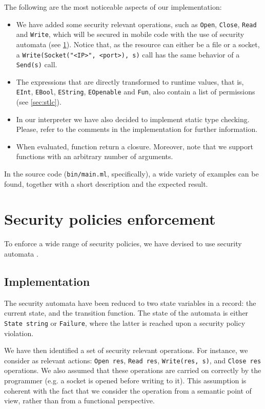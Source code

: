The following are the most noticeable aspects of our implementation:
\begin{itemize}
    \item We have added some security relevant operations, such as \lstinline{Open}, \lstinline{Close}, \lstinline{Read} and \lstinline{Write}, which will be secured in mobile code with the use of security automata (see \cref{sec:spe}). Notice that, as the resource can either be a file or a socket, a \lstinline{Write(Socket("<IP>", <port>), s)} call has the same behavior of a \lstinline{Send(s)} call.
    \item The expressions that are directly transformed to runtime values, that is, \lstinline{EInt}, \lstinline{EBool}, \lstinline{EString}, \lstinline{EOpenable} and \lstinline{Fun}, also contain a list of permissions (see \cref{sec:stlc}).
    \item In our interpreter we have also decided to implement static type checking. Please, refer to the comments in the implementation for further information.
    \item When evaluated, function return a closure. Moreover, note that we support functions with an arbitrary number of arguments.
\end{itemize}

In the source code (\lstinline{bin/main.ml}, specifically), a wide variety of examples can be found, together with a short description and the expected result.

\section{Security policies enforcement}
\label{sec:spe}
To enforce a wide range of security policies, we have devised to use security automata \cite{erlingsson2000sasi,10.1145/353323.353382}.

\subsection{Implementation}
The security automata have been reduced to two state variables in a record: the current state, and the transition function. The state of the automata is either \lstinline{State string} or \lstinline{Failure}, where the latter is reached upon a security policy violation.

We have then identified a set of security relevant operations. For instance, we consider as relevant actions: \lstinline{Open res}, \lstinline{Read res}, \lstinline{Write(res, s)}, and \lstinline{Close res} operations.
We also assumed that these operations are carried on correctly by the programmer (e.g. a socket is opened before writing to it). This assumption is coherent with the fact that we consider the operation from a semantic point of view, rather than from a functional perspective.

